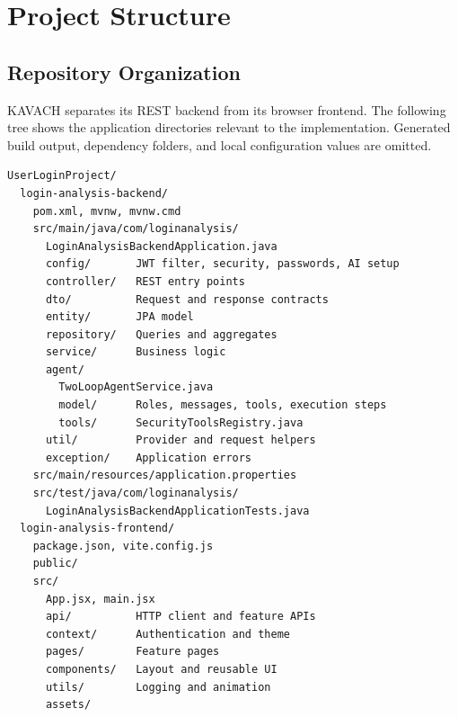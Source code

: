 \chapter{Project Structure}
\section{Repository Organization}
KAVACH separates its REST backend from its browser frontend. The following tree shows the application directories relevant to the implementation. Generated build output, dependency folders, and local configuration values are omitted.
\begingroup\footnotesize{}
\begin{lstlisting}[basicstyle=\ttfamily\scriptsize]
UserLoginProject/
  login-analysis-backend/
    pom.xml, mvnw, mvnw.cmd
    src/main/java/com/loginanalysis/
      LoginAnalysisBackendApplication.java
      config/       JWT filter, security, passwords, AI setup
      controller/   REST entry points
      dto/          Request and response contracts
      entity/       JPA model
      repository/   Queries and aggregates
      service/      Business logic
      agent/
        TwoLoopAgentService.java
        model/      Roles, messages, tools, execution steps
        tools/      SecurityToolsRegistry.java
      util/         Provider and request helpers
      exception/    Application errors
    src/main/resources/application.properties
    src/test/java/com/loginanalysis/
      LoginAnalysisBackendApplicationTests.java
  login-analysis-frontend/
    package.json, vite.config.js
    public/
    src/
      App.jsx, main.jsx
      api/          HTTP client and feature APIs
      context/      Authentication and theme
      pages/        Feature pages
      components/   Layout and reusable UI
      utils/        Logging and animation
      assets/
\end{lstlisting}
\endgroup

